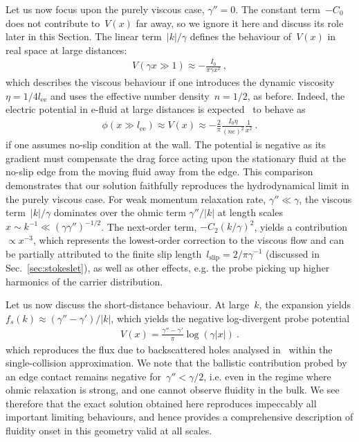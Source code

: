 \documentclass[preprint,aps,eqsecnum, prb]{revtex4-1}
\begin{document}
Let us now focus upon the purely viscous case, $\gamma'' = 0$.
The constant term~$-C_0$ does not contribute to~$V(x)$ far away,
so we ignore it here and discuss its role later in this Section.
The linear term~$|k|/\gamma$ defines the behaviour
of~$V(x)$ in real space at large distances:
\begin{align}
  V(\gamma x \gg 1) \approx - \frac{I_0}{\pi \gamma x^2}\ ,
\end{align}
which describes the viscous behaviour if one introduces
the dynamic viscosity~$\eta = 1/4 l_\mathrm{ee}$ and uses
the effective number density~$n = 1/2$, as before.
Indeed, the electric potential in e-fluid at large distances
is expected~\cite{bib:Levitov-Falkovich} to behave as
\begin{align}
  \phi(x\gg l_\mathrm{ee})
  \approx V(x) \approx - \frac{2}{\pi} \frac{I_0 \eta}{(ne)^2}
  \frac{1}{x^2}\ .
\end{align}
if one assumes no-slip condition at the wall. The potential is
negative as its gradient must compensate the drag force acting
upon the stationary fluid at the no-slip edge from the moving fluid
away from the edge.
This comparison demonstrates that our solution faithfully
reproduces the hydrodynamical limit in the purely viscous case.
For weak momentum relaxation rate, $\gamma'' \ll \gamma$,
the viscous term~$|k|/\gamma$ dominates over the ohmic term
$\gamma''/|k|$ at length scales~$x \sim k^{-1} \ll (\gamma \gamma'')^{-1/2}$.
The next-order term, $-C_2 (k/\gamma)^2$, yields a contribution
$\propto x^{-3}$, which represents the lowest-order
correction to the viscous flow and can be partially attributed
to the finite slip length~$l_\mathrm{slip} = 2/\pi \gamma^{-1}$
(discussed in Sec.~\ref{sec:stokeslet}),
as well as other effects, e.g. the probe picking up higher harmonics
of the carrier distribution.

Let us now discuss the short-distance behaviour.
At large~$k$, the expansion yields
$f_{s}(k) \approx (\gamma'' - \gamma') / |k|$, which yields
the negative log-divergent probe potential
\begin{align}
  V(x) = \frac{\gamma'' - \gamma'}{\pi} \log(\gamma |x|)\ .
\end{align}
which
reproduces the flux due to backscattered holes analysed
in~\cite{bib:Shytov-et-al} within  the single-collision approximation.
We note that the ballistic contribution probed by an edge contact
remains negative for~$\gamma'' <  \gamma / 2$, i.e. even in the
regime where ohmic relaxation is strong, and one cannot observe
fluidity in the bulk.
We see therefore that the exact solution obtained here reproduces
impeccably all important  limiting behaviours, and hence provides
a comprehensive description of fluidity onset in this geometry
valid at all scales.
\end{document}
